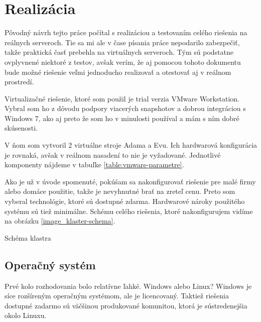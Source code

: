 \chapter{Realizácia}
Pôvodný návrh tejto práce počítal s realizáciou a testovaním celého riešenia na reálnych serveroch. Tie sa mi ale v čase písania práce nepodarilo zabezpečiť, takže praktická časť prebehla na virtuálnych serveroch. Tým sú podstatne ovplyvnené niektoré z testov, avšak verím, že aj pomocou tohoto dokumentu bude možné riešenie veľmi jednoducho realizovať a otestovať aj v reálnom prostredí.

Virtualizačné riešenie, ktoré som použil je trial verzia VMware Workstation. Vybral som ho z dôvodu podpory viacerých snapshotov a dobrou integráciou s Windows 7, ako aj preto že som ho v minulosti používal a mám s ním dobré skúsenosti.

V ňom som vytvoril 2 virtuálne stroje Adama a Evu. Ich hardwarová konfigurácia je rovnaká, avšak v reálnom nasadení to nie je vyžadované. Jednotlivé komponenty nájdeme v tabuľke \ref{table:vmware-parametre}.


Ako je už v úvode spomenuté, pokúšam sa nakonfigurovať riešenie pre malé firmy alebo domáce použitie, takže je nevyhnutné brať na zreteľ cenu. Preto som vyberal technológie, ktoré sú dostupné zdarma. Hardwarové nároky použitého systému sú tiež minimálne. Schému celého riešenia, ktoré nakonfigurujem vidíme na obrázku \ref{image_klaster-schema}. 

 {Schéma klastra}

\section{Operačný systém} %
Prvé kolo rozhodovania bolo relatívne ľahké. Windows alebo Linux? Windows je síce rozšíreným operačným systémom, ale je licencovaný. Taktiež riešenia dostupné zadarmo sú väčšinou produkované komunitou, ktorá je sústredenejšia okolo Linuxu.

